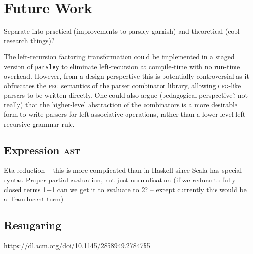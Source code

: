 \documentclass[../../main.tex]{subfiles}
\begin{document}
\section{Future Work}
Separate into practical (improvements to parsley-garnish) and theoretical (cool research things)?

The left-recursion factoring transformation could be implemented in a staged version of \texttt{parsley} to eliminate left-recursion at compile-time with no run-time overhead.
However, from a design perspective this is potentially controversial as it obfuscates the \textsc{peg} semantics of the parser combinator library, allowing \textsc{cfg}-like parsers to be written directly.
One could also argue (pedagogical perspective? not really) that the higher-level abstraction of the  combinators is a more desirable form to write parsers for left-associative operations, rather than a lower-level left-recursive grammar rule.

\subsection{Expression \textsc{ast}}
Eta reduction -- this is more complicated than in Haskell since Scala has special syntax %
Proper partial evaluation, not just normalisation (if we reduce to fully closed terms 1+1 can we get it to evaluate to 2? -- except currently this would be a Translucent term)

\subsection{Resugaring}
https://dl.acm.org/doi/10.1145/2858949.2784755
\end{document}
